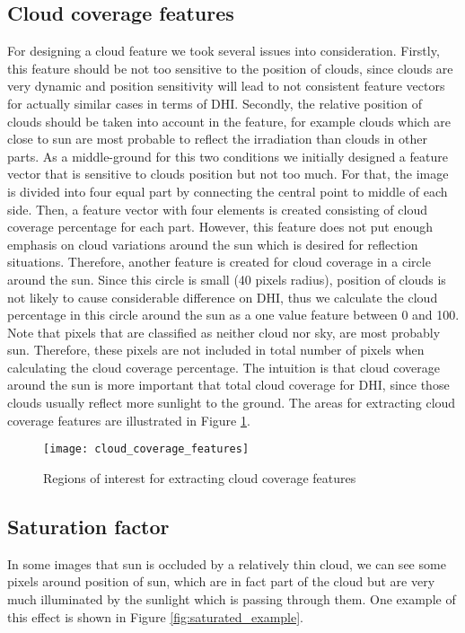 \subsection{Cloud coverage features}
\label{sec:cc_around_sun}
For designing a cloud feature we took several issues into consideration. Firstly, this feature should be not too sensitive to the position of clouds, since clouds are very dynamic and position sensitivity will lead to not consistent feature vectors for actually similar cases in terms of DHI. Secondly, the relative position of clouds should be taken into account in the feature, for example clouds which are close to sun are most probable to reflect the irradiation than clouds in other parts. As a middle-ground for this two conditions we initially designed a feature vector that is sensitive to clouds position but not too much. For that, the image is divided into four equal part by connecting the central point to middle of each side. Then, a feature vector with four elements is created consisting of cloud coverage percentage for each part. However, this feature does not put enough emphasis on cloud variations around the sun which is desired for reflection situations. Therefore, another feature is created for cloud coverage in a circle around the sun. Since this circle is small (40 pixels radius), position of clouds is not likely to cause considerable difference on DHI, thus we calculate the cloud percentage in this circle around the sun as a one value feature between 0 and 100. Note that pixels that are classified as neither cloud nor sky, are most probably sun. Therefore, these pixels are not included in total number of pixels when calculating the cloud coverage percentage. The intuition is that cloud coverage around the sun is more important that total cloud coverage for DHI, since those clouds usually reflect more sunlight to the ground. The areas for extracting cloud coverage features are illustrated in Figure \ref{fig:cloud_coverage_features}.

\begin{figure}[h]
\caption{Regions of interest for extracting cloud coverage features}
\label{fig:cloud_coverage_features}
\texttt{[image: cloud\_coverage\_features]}
\centering
\end{figure}

\subsection{Saturation factor}
\label{sec:saturation}
In some images that sun is occluded by a relatively thin cloud, we can see some pixels around position of sun, which are in fact part of the cloud but are very much illuminated by the sunlight which is passing through them. One example of this effect is shown in Figure \ref{fig:saturated_example}. 

